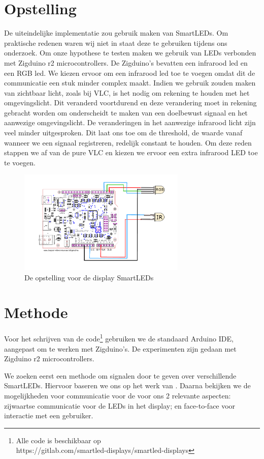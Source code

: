 \documentclass{article}
\begin{document}
\section{Opstelling}
De uiteindelijke implementatie zou gebruik maken van SmartLEDs. Om praktische redenen waren wij niet in staat deze te gebruiken tijdens ons onderzoek. 
Om onze hypothese te testen maken we gebruik van LEDs verbonden met Zigduino r2 microcontrollers. De Zigduino’s bevatten een infrarood led en een RGB led. We kiezen ervoor om een infrarood led toe te voegen omdat dit de communicatie een stuk minder complex maakt. Indien we gebruik zouden maken van zichtbaar licht, zoals bij VLC, is het nodig om rekening te houden met het omgevingslicht. Dit veranderd voortdurend en deze verandering moet in rekening gebracht worden om onderscheidt te maken van een doelbewust signaal en het aanwezige omgevingslicht. De veranderingen in het aanwezige infrarood licht zijn veel minder uitgesproken. Dit laat ons toe om de threshold, de waarde vanaf wanneer we een signaal registreren, redelijk constant te houden. Om deze reden stappen we af van de pure VLC en kiezen we ervoor een extra infrarood LED toe te voegen.

\begin{figure}[H]
\centering
\includegraphics[width=8cm]{Opstelling.png}
\caption{De opstelling voor de display SmartLEDs}
\label{fig:opstelling}
\end{figure}


\section{Methode}

Voor het schrijven van de code\footnote{Alle code is beschikbaar op \\ https://gitlab.com/smartled-displays/smartled-displays} gebruiken we de standaard Arduino IDE, aangepast om te werken met Zigduino's. De experimenten zijn gedaan met Zigduino r2 microcontrollers.

We zoeken eerst een methode om signalen door te geven over verschillende SmartLEDs. Hiervoor baseren we ons op het werk van \cite{smartLED}. Daarna bekijken we de mogelijkheden voor communicatie voor de voor ons 2 relevante aspecten: zijwaartse communicatie voor de LEDs in het display; en face-to-face voor interactie met een gebruiker.
 
\end{document}

